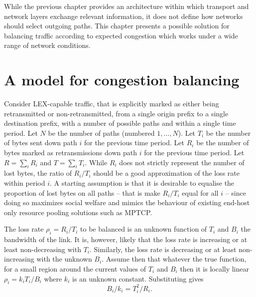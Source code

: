 While the previous chapter provides an architecture within which transport and network layers exchange relevant information, it does not define how networks should select outgoing paths. 
This chapter presents a possible solution for balancing traffic according to expected congestion which works under a wide range of network conditions.

\section{A model for congestion balancing}

Consider \ac{LEX}-capable traffic, that is explicitly marked as either being retransmitted or non-retransmitted, from a single origin prefix to a single destination prefix, with a number of possible paths and within a single time period.  
Let $N$ be the number of paths (numbered $1,\ldots,N$). 
Let $T_i$ be the number of bytes sent down path $i$ for the previous time period. 
Let $R_i$ be the number of bytes marked as retransmissions down path $i$ for the previous time period.  
Let $R=\sum_i R_i$ and $T=\sum_i T_i$.
While $R_i$ does not strictly represent the number of lost bytes, the ratio of $R_i/T_i$ should be a good approximation of the loss rate within period $i$.
A starting assumption is that it is desirable to equalise the proportion of lost bytes on all paths -- that is make $R_i/T_i$ equal for all $i$ -- since doing so maximizes social welfare and mimics the behaviour of existing end-host only resource pooling solutions such as \ac{MPTCP}.

The loss rate $\rho_i = R_i/T_i$ to be balanced is an unknown function of $T_i$ and $B_i$ the bandwidth of the link.
It is, however, likely that the loss rate is increasing or at least non-decreasing with $T_i$.
Similarly, the loss rate is decreasing or at least non-increasing with the unknown $B_i$.
Assume then that whatever the true function, for a small region around the current values of $T_i$ and $B_i$ then it is locally linear $\rho_i = k_i T_i/B_i$ where $k_i$ is an unknown constant.
Substituting gives
\begin{equation}
B_i/k_i = T_i^2/R_i.
\label{eqn:bik}
\end{equation}

